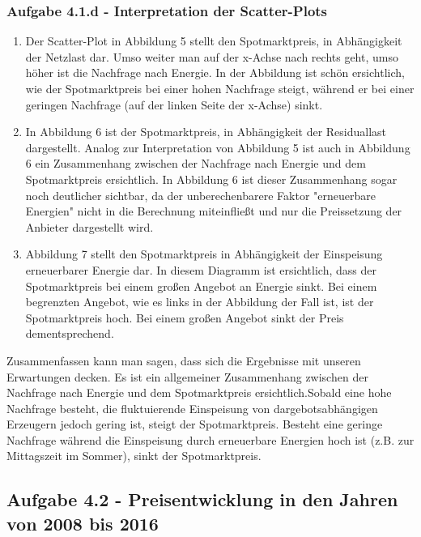 \documentclass[a4paper,12pt]{article}
\begin{document}
	\subsubsection{Aufgabe 4.1.d - Interpretation der Scatter-Plots}
	\label{sec:Ergebnisse41d}
	\begin{enumerate}
		\item Der Scatter-Plot in Abbildung 5 stellt den Spotmarktpreis, in Abhängigkeit der Netzlast dar.\newline
		Umso weiter man auf der x-Achse nach rechts geht, umso höher ist die Nachfrage nach Energie. In der Abbildung ist schön ersichtlich, wie der Spotmarktpreis bei einer hohen Nachfrage steigt, während er bei einer geringen Nachfrage (auf der linken Seite der x-Achse) sinkt.
		\item In Abbildung 6 ist der Spotmarktpreis, in Abhängigkeit der Residuallast dargestellt.\newline
		Analog zur Interpretation von Abbildung 5 ist auch in Abbildung 6 ein Zusammenhang zwischen der Nachfrage nach Energie und dem Spotmarktpreis ersichtlich. In Abbildung 6 ist dieser Zusammenhang sogar noch deutlicher sichtbar, da der unberechenbarere Faktor "erneuerbare Energien" nicht in die Berechnung miteinfließt und nur die Preissetzung der Anbieter dargestellt wird.
		\item Abbildung 7 stellt den Spotmarktpreis in Abhängigkeit der Einspeisung erneuerbarer Energie dar.\newline
		In diesem Diagramm ist ersichtlich, dass der Spotmarktpreis bei einem großen Angebot an Energie sinkt. Bei einem begrenzten Angebot, wie es links in der Abbildung der Fall ist, ist der Spotmarktpreis hoch. Bei einem großen Angebot sinkt der Preis dementsprechend.
	\end{enumerate}
	Zusammenfassen kann man sagen, dass sich die Ergebnisse mit unseren Erwartungen decken. Es ist ein allgemeiner Zusammenhang zwischen der Nachfrage nach Energie und dem Spotmarktpreis ersichtlich.\newline Sobald eine hohe Nachfrage besteht, die fluktuierende Einspeisung von dargebotsabhängigen Erzeugern jedoch gering ist, steigt der Spotmarktpreis.\newline
	Besteht eine geringe Nachfrage während die Einspeisung durch erneuerbare Energien hoch ist (z.B. zur Mittagszeit im Sommer), sinkt der Spotmarktpreis.
	\subsection{Aufgabe 4.2 - Preisentwicklung in den Jahren von 2008 bis 2016}
\end{document}

